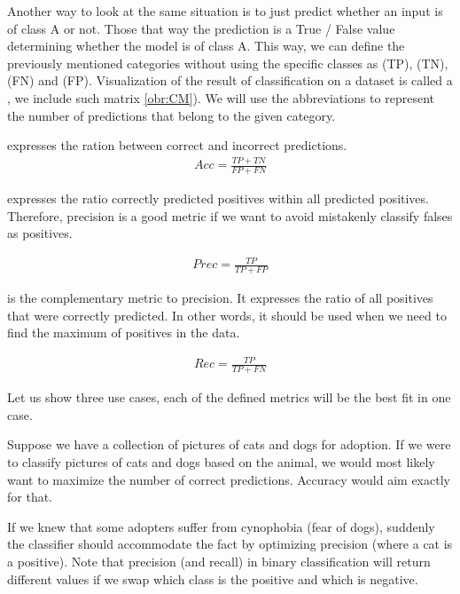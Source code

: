 Another way to look at the same situation is to just predict whether an input is of class A or not. Those that way the prediction is a True / False value determining whether the model is of class A. This way, we can define the previously mentioned categories without using the specific classes as  (TP),  (TN),  (FN) and  (FP). Visualization of the result of classification on a dataset is called a , we include such matrix \ref{obr:CM}). We will use the abbreviations to represent the number of predictions that belong to the given category.  



 expresses the ration between correct and incorrect predictions.
\begin{align}
Acc = \frac{TP+TN}{FP+FN}
\end{align} 



 expresses the ratio correctly predicted positives within all predicted positives. Therefore, precision is a good metric if we want to avoid mistakenly classify falses as positives.

\begin{align} 
Prec = \frac{TP}{TP + FP}
\end{align}

 is the complementary metric to precision. It expresses the ratio of all positives that were correctly predicted. In other words, it should be used when we need to find the maximum of positives in the data.

\begin{align}
Rec = \frac{TP}{TP + FN}
\end{align}

Let us show three use cases, each of the defined metrics will be the best fit in one case.

Suppose we have a collection of pictures of cats and dogs for adoption. If we were to classify pictures of cats and dogs based on the animal, we would most likely want to maximize the number of correct predictions. Accuracy would aim exactly for that.

If we knew that some adopters suffer from cynophobia (fear of dogs), suddenly the classifier should accommodate the fact by optimizing precision (where a cat is a positive). Note that precision (and recall) in binary classification will return different values if we swap which class is the positive and which is negative.

